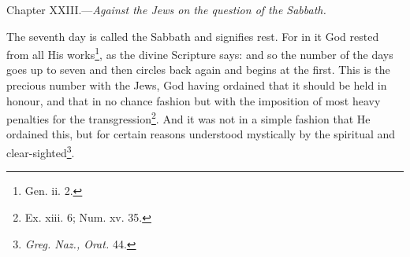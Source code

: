 
Chapter XXIII.—\emph{Against the Jews on the question of the Sabbath.}

The seventh day is called the Sabbath and signifies rest. For in it God rested from all His works\footnote{Gen. ii. 2.}, as the divine Scripture says: and so the number of the days goes up to seven and then circles back again and begins at the first. This is the precious number with the Jews, God having ordained that it should be held in honour, and that in no chance fashion but with the imposition of most heavy penalties for the transgression\footnote{Ex. xiii. 6; Num. xv. 35.}. And it was not in a simple fashion that He ordained this, but for certain reasons understood mystically by the spiritual and clear-sighted\footnote{\emph{Greg. Naz., Orat. }44.}.

